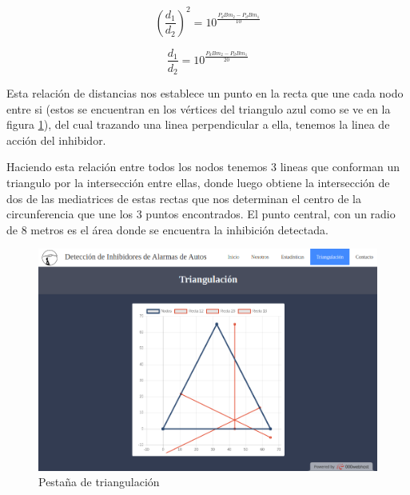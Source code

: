  \begin{equation}
    \left(\frac{d_1}{d_2}\right)^{2} = 10^{\frac{P_dBm_2 - P_dBm_1}{10}}
\end{equation}

 \begin{equation}\label{eq:triangulacion}
    \frac{d_1}{d_2} = 10^{\frac{P_dBm_2 - P_dBm_1}{20}}
\end{equation}

\par Esta relación de distancias nos establece un punto en la recta que une cada nodo entre si (estos se encuentran en los vértices del triangulo azul como se 
ve en la figura \ref{web_triangulacion}), del cual trazando una linea perpendicular a ella, tenemos la linea de acción del inhibidor.
\par Haciendo esta relación entre todos los nodos tenemos 3 lineas que conforman un triangulo por la intersección entre ellas, donde luego obtiene la 
intersección de dos de las mediatrices de estas rectas que nos determinan el centro de la circunferencia que une los 3 puntos encontrados. El punto central, 
con un radio de 8 metros es el área donde se encuentra la inhibición detectada. 


\begin{figure}[h!]
	\centering
	\includegraphics[scale=0.45]{images/web/triangulacion-web.png}
    \caption{Pestaña de triangulación}
	\label{web_triangulacion}
\end{figure}
